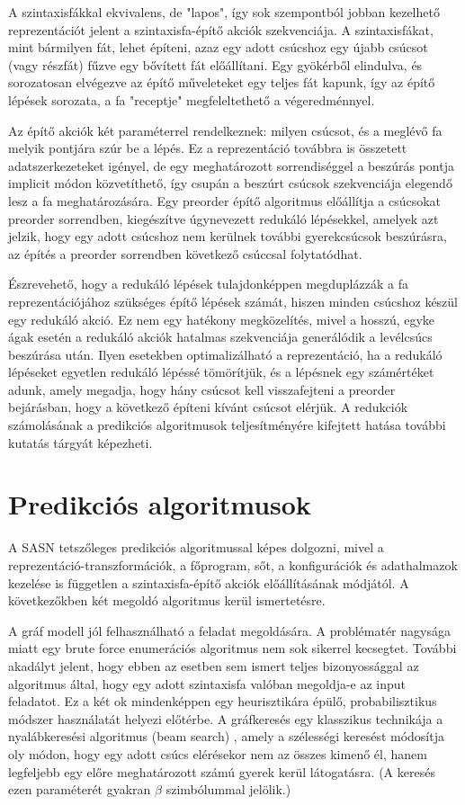 \documentclass[twoside, 12pt]{report}
\begin{document}
A szintaxisfákkal ekvivalens, de "lapos", így sok szempontból jobban kezelhető reprezentációt jelent a szintaxisfa-építő akciók szekvenciája. A szintaxisfákat, mint bármilyen fát, lehet építeni, azaz egy adott csúcshoz egy újabb csúcsot (vagy részfát) fűzve egy bővített fát előállítani. Egy gyökérből elindulva, és sorozatosan elvégezve az építő műveleteket egy teljes fát kapunk, így az építő lépések sorozata, a fa "receptje" megfeleltethető a végeredménnyel.

Az építő akciók két paraméterrel rendelkeznek: milyen csúcsot, és a meglévő fa melyik pontjára szúr be a lépés. Ez a reprezentáció továbbra is összetett adatszerkezeteket igényel, de egy meghatározott sorrendiséggel a beszúrás pontja implicit módon közvetíthető, így csupán a beszúrt csúcsok szekvenciája elegendő lesz a fa meghatározására. Egy preorder építő algoritmus előállítja a csúcsokat preorder sorrendben, kiegészítve úgynevezett redukáló lépésekkel, amelyek azt jelzik, hogy egy adott csúcshoz nem kerülnek további gyerekcsúcsok beszúrásra, az építés a preorder sorrendben következő csúccsal folytatódhat.

Észrevehető, hogy a redukáló lépések tulajdonképpen megduplázzák a fa reprezentációjához szükséges építő lépések számát, hiszen minden csúcshoz készül egy redukáló akció. Ez nem egy hatékony megközelítés, mivel a hosszú, egyke ágak esetén a redukáló akciók hatalmas szekvenciája generálódik a levélcsúcs beszúrása után. Ilyen esetekben optimalizálható a reprezentáció, ha a redukáló lépéseket egyetlen redukáló lépéssé tömörítjük, és a lépésnek egy számértéket adunk, amely megadja, hogy hány csúcsot kell visszafejteni a preorder bejárásban, hogy a következő építeni kívánt csúcsot elérjük. A redukciók számolásának a predikciós algoritmusok teljesítményére kifejtett hatása további kutatás tárgyát képezheti.

\section{Predikciós algoritmusok}

A SASN tetszőleges predikciós algoritmussal képes dolgozni, mivel a reprezentáció-transzformációk, a főprogram, sőt, a konfigurációk és adathalmazok kezelése is független a szintaxisfa-építő akciók előállításának módjától. A következőkben két megoldó algoritmus kerül ismertetésre.

A gráf modell jól felhasználható a feladat megoldására. A problématér nagysága miatt egy brute force enumerációs algoritmus nem sok sikerrel kecsegtet. További akadályt jelent, hogy ebben az esetben sem ismert teljes bizonyossággal az algoritmus által, hogy egy adott szintaxisfa valóban megoldja-e az input feladatot. Ez a két ok mindenképpen egy heurisztikára épülő, probabilisztikus módszer használatát helyezi előtérbe. A gráfkeresés egy klasszikus technikája a nyalábkeresési algoritmus (beam search) \parencite{Red77a}, amely a szélességi keresést módosítja oly módon, hogy egy adott csúcs elérésekor nem az összes kimenő él, hanem legfeljebb egy előre meghatározott számú gyerek kerül látogatásra. (A keresés ezen paraméterét gyakran $\beta$ szimbólummal jelölik.)
\end{document}

